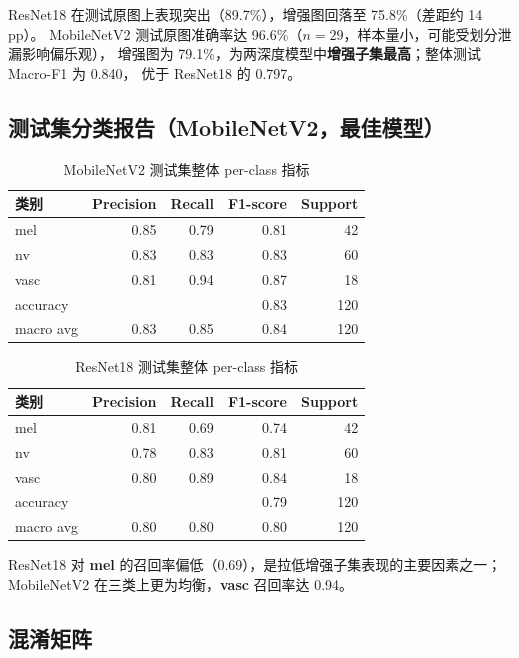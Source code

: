 \documentclass[12pt,a4paper]{ctexart}
\begin{document}
ResNet18 在测试原图上表现突出（89.7\%），增强图回落至 75.8\%（差距约 14 pp）。
MobileNetV2 测试原图准确率达 96.6\%（$n{=}29$，样本量小，可能受划分泄漏影响偏乐观），
增强图为 79.1\%，为两深度模型中\textbf{增强子集最高}；整体测试 Macro-F1 为 0.840，
优于 ResNet18 的 0.797。

\subsection{测试集分类报告（MobileNetV2，最佳模型）}

\begin{table}[H]
  \centering
  \caption{MobileNetV2 测试集整体 per-class 指标}
  \label{tab:mb_test_report}
  \begin{tabular}{lrrrr}
    \toprule
    类别 & Precision & Recall & F1-score & Support \\
    \midrule
    mel  & 0.85 & 0.79 & 0.81 & 42 \\
    nv   & 0.83 & 0.83 & 0.83 & 60 \\
    vasc & 0.81 & 0.94 & 0.87 & 18 \\
    \midrule
    accuracy & \multicolumn{3}{r}{0.83} & 120 \\
    macro avg & 0.83 & 0.85 & 0.84 & 120 \\
    \bottomrule
  \end{tabular}
\end{table}

\begin{table}[H]
  \centering
  \caption{ResNet18 测试集整体 per-class 指标}
  \label{tab:rn_test_report}
  \begin{tabular}{lrrrr}
    \toprule
    类别 & Precision & Recall & F1-score & Support \\
    \midrule
    mel  & 0.81 & 0.69 & 0.74 & 42 \\
    nv   & 0.78 & 0.83 & 0.81 & 60 \\
    vasc & 0.80 & 0.89 & 0.84 & 18 \\
    \midrule
    accuracy & \multicolumn{3}{r}{0.79} & 120 \\
    macro avg & 0.80 & 0.80 & 0.80 & 120 \\
    \bottomrule
  \end{tabular}
\end{table}

ResNet18 对 \textbf{mel} 的召回率偏低（0.69），是拉低增强子集表现的主要因素之一；
MobileNetV2 在三类上更为均衡，\textbf{vasc} 召回率达 0.94。

\subsection{混淆矩阵}
\end{document}
